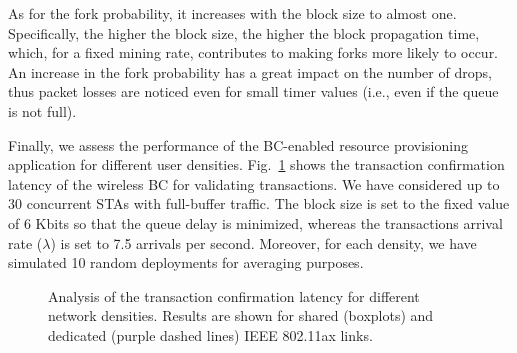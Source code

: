 \documentclass[conference]{IEEEtran}
\theoremstyle{definition}
\begin{document}
As for the fork probability, it increases with the block size to almost one. Specifically, the higher the block size, the higher the block propagation time, which, for a fixed mining rate, contributes to making forks more likely to occur. An increase in the fork probability has a great impact on the number of drops, thus packet losses are noticed even for small timer values (i.e., even if the queue is not full).

Finally, we assess the performance of the BC-enabled resource provisioning application for different user densities. Fig.~\ref{fig:density_analysis} shows the transaction confirmation latency of the wireless BC for validating transactions. We have considered up to 30 concurrent STAs with full-buffer traffic. The block size is set to the fixed value of 6 Kbits so that the queue delay is minimized, whereas the transactions arrival rate ($\lambda$) is set to 7.5 arrivals per second. Moreover, for each density, we have simulated 10 random deployments for averaging purposes. %

\begin{figure}[ht!]
\centering
{} 
\caption{Analysis of the transaction confirmation latency for different network densities. Results are shown for shared (boxplots) and dedicated (purple dashed lines) IEEE 802.11ax links.}
\label{fig:density_analysis}
\end{figure}
\end{document}

